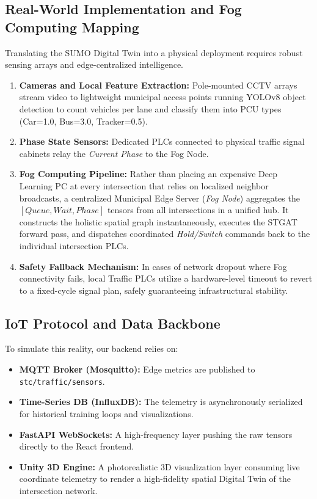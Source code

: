 \documentclass[12pt, onecolumn]{IEEEtran}
\begin{document}
\subsection{Real-World Implementation and Fog Computing Mapping}
Translating the SUMO Digital Twin into a physical deployment requires robust sensing arrays and edge-centralized intelligence.
\begin{enumerate}
    \item \textbf{Cameras and Local Feature Extraction:} Pole-mounted CCTV arrays stream video to lightweight municipal access points running YOLOv8 object detection to count vehicles per lane and classify them into PCU types (Car=1.0, Bus=3.0, Tracker=0.5).
    \item \textbf{Phase State Sensors:} Dedicated PLCs connected to physical traffic signal cabinets relay the \textit{Current Phase} to the Fog Node.
    \item \textbf{Fog Computing Pipeline:} Rather than placing an expensive Deep Learning PC at every intersection that relies on localized neighbor broadcasts, a centralized Municipal Edge Server (\textit{Fog Node}) aggregates the $[Queue, Wait, Phase]$ tensors from all intersections in a unified hub. It constructs the holistic spatial graph instantaneously, executes the STGAT forward pass, and dispatches coordinated \textit{Hold/Switch} commands back to the individual intersection PLCs.
    \item \textbf{Safety Fallback Mechanism:} In cases of network dropout where Fog connectivity fails, local Traffic PLCs utilize a hardware-level timeout to revert to a fixed-cycle signal plan, safely guaranteeing infrastructural stability.
\end{enumerate}

\subsection{IoT Protocol and Data Backbone}
To simulate this reality, our backend relies on:
\begin{itemize}
    \item \textbf{MQTT Broker (Mosquitto):} Edge metrics are published to \texttt{stc/traffic/sensors}.
    \item \textbf{Time-Series DB (InfluxDB):} The telemetry is asynchronously serialized for historical training loops and visualizations.
    \item \textbf{FastAPI WebSockets:} A high-frequency layer pushing the raw tensors directly to the React frontend.
    \item \textbf{Unity 3D Engine:} A photorealistic 3D visualization layer consuming live coordinate telemetry to render a high-fidelity spatial Digital Twin of the intersection network.
\end{itemize}
\end{document}
